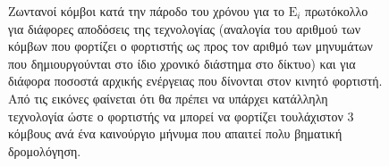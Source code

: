 \begin{figure}[H]
  \centering
  \caption{Ζωντανοί κόμβοι κατά την πάροδο του χρόνου για το $\text{E}_{i}$ πρωτόκολλο για διάφορες αποδόσεις της τεχνολογίας (αναλογία του αριθμού των κόμβων που
φορτίζει ο φορτιστής ως προς τον αριθμό των μηνυμάτων που δημιουργούνται στο ίδιο χρονικό διάστημα στο δίκτυο) και για διάφορα ποσοστά αρχικής ενέργειας που δίνονται
στον κινητό φορτιστή. Από τις εικόνες φαίνεται ότι θα πρέπει να υπάρχει κατάλληλη τεχνολογία ώστε ο φορτιστής να μπορεί να φορτίζει τουλάχιστον 3 κόμβους ανά ένα
καινούργιο μήνυμα που απαιτεί πολυ βηματική δρομολόγηση.}
  \label{fig:5exp_1_3}
\end{figure}
